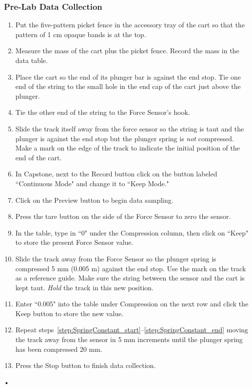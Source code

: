 \documentclass[main.tex]{subfiles}
\begin{document}
\subsubsection*{Pre-Lab Data Collection}
\begin{enumerate}
\item
Put the five-pattern picket fence in the accessory tray of the cart so that the pattern of 1 cm opaque bands is at the top.
\item
Measure the mass of the cart plus the picket fence. Record the mass in the data table.
\item
Place the cart so the end of its plunger bar is against the end stop. Tie one end of the string to the small hole in the end cap of the cart just above the plunger.
\item
Tie the other end of the string to the Force Sensor's hook.
\item
Slide the track itself away from the force sensor so the string is taut and the plunger is against the end stop but the plunger spring is \emph{not} compressed. Make a mark on the edge of the track to indicate the initial position of the end of the cart.
\item
In Capstone, next to the Record button click on the button labeled ``Continuous Mode" and change it to ``Keep Mode."
\item
Click on the Preview button to begin data sampling.
\item
Press the tare button on the side of the Force Sensor to zero the sensor.
\item
In the table, type in ``0" under the Compression column, then click on ``Keep" to store the present Force Sensor value.
\item \label{step:SpringConstant_start}
Slide the track away from the Force Sensor so the plunger spring is compressed 5 mm (0.005 m) against the end stop. Use the mark on the track as a reference guide. Make sure the string between the sensor and the cart is kept taut. \emph{Hold} the track in this new position.
\item \label{step:SpringConstant_end}
Enter ``0.005" into the table under Compression on the next row and click the Keep button to store the new value.
\item
Repeat steps~\ref{step:SpringConstant_start}--\ref{step:SpringConstant_end} moving the track away from the sensor in 5 mm increments until the plunger spring has been compressed 20 mm.
\item
Press the Stop button to finish data collection.
\end{enumerate}•
\end{document}
